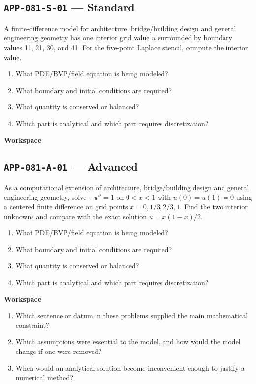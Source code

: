 \documentclass[11pt]{book}
\newcommand{\pid}[1]{\texttt{#1}}
\newcommand{\workspace}{\par\vspace{0.7in}\hrulefill\par\vspace{0.55in}\hrulefill\par}
\begin{document}
\subsection*{\pid{APP-081-S-01} — Standard}
\begin{problembox}
A finite-difference model for architecture, bridge/building design and general engineering geometry has one interior grid value $u$ surrounded by boundary values 11, 21, 30, and 41. For the five-point Laplace stencil, compute the interior value.
\end{problembox}
\begin{promptbox}\begin{enumerate}
\item What PDE/BVP/field equation is being modeled?
\item What boundary and initial conditions are required?
\item What quantity is conserved or balanced?
\item Which part is analytical and which part requires discretization?
\end{enumerate}\end{promptbox}
\textbf{Workspace}\workspace
{}
\subsection*{\pid{APP-081-A-01} — Advanced}
\begin{problembox}
As a computational extension of architecture, bridge/building design and general engineering geometry, solve $-u''=1$ on $0<x<1$ with $u(0)=u(1)=0$ using a centered finite difference on grid points $x=0,1/3,2/3,1$. Find the two interior unknowns and compare with the exact solution $u=x(1-x)/2$.
\end{problembox}
\begin{promptbox}\begin{enumerate}
\item What PDE/BVP/field equation is being modeled?
\item What boundary and initial conditions are required?
\item What quantity is conserved or balanced?
\item Which part is analytical and which part requires discretization?
\end{enumerate}\end{promptbox}
\textbf{Workspace}\workspace
\begin{reflectionbox}\begin{enumerate}
\item Which sentence or datum in these problems supplied the main mathematical constraint?
\item Which assumptions were essential to the model, and how would the model change if one were removed?
\item When would an analytical solution become inconvenient enough to justify a numerical method?
\end{enumerate}\end{reflectionbox}
\end{document}
